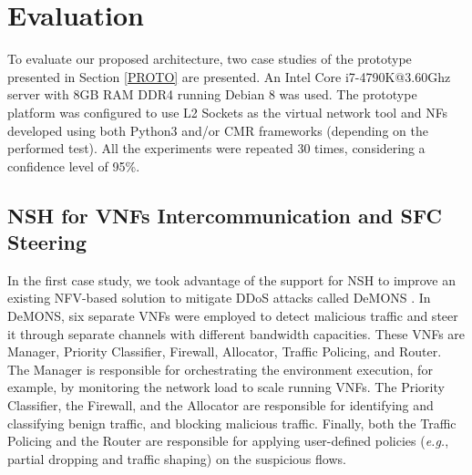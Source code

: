 \section{Evaluation}

To evaluate our proposed architecture, two case studies of the prototype presented in Section \ref{PROTO} are presented. An Intel Core i7-4790K@3.60Ghz server with 8GB RAM DDR4 running Debian 8 was used. The prototype platform was configured to use L2 Sockets as the virtual network tool and NFs developed using both Python3 and/or CMR frameworks (depending on the performed test). All the experiments were repeated 30 times, considering a confidence level of 95\%.


\subsection{NSH for VNFs Intercommunication and SFC Steering}

In the first case study, we took advantage of the support for NSH to improve an existing NFV-based solution to mitigate DDoS attacks called DeMONS \cite{Garcia-2018}. In DeMONS, six separate VNFs were employed to detect malicious traffic and steer it through separate channels with different bandwidth capacities. These VNFs are Manager, Priority Classifier, Firewall, Allocator, Traffic Policing, and Router. The Manager is responsible for orchestrating the environment execution, for example, by monitoring the network load to scale running VNFs. The Priority Classifier, the Firewall, and the Allocator are responsible for identifying and classifying benign traffic, and blocking malicious traffic. Finally, both the Traffic Policing and the Router are responsible for applying user-defined policies (\textit{e.g.}, partial dropping and traffic shaping) on the suspicious flows.

